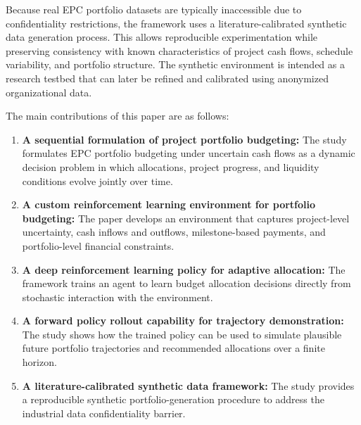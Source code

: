 Because real EPC portfolio datasets are typically inaccessible due to confidentiality restrictions, the framework uses a literature-calibrated synthetic data generation process. This allows reproducible experimentation while preserving consistency with known characteristics of project cash flows, schedule variability, and portfolio structure. The synthetic environment is intended as a research testbed that can later be refined and calibrated using anonymized organizational data.

The main contributions of this paper are as follows:

\begin{enumerate}
    \item \textbf{A sequential formulation of project portfolio budgeting:} The study formulates EPC portfolio budgeting under uncertain cash flows as a dynamic decision problem in which allocations, project progress, and liquidity conditions evolve jointly over time.

    \item \textbf{A custom reinforcement learning environment for portfolio budgeting:} The paper develops an environment that captures project-level uncertainty, cash inflows and outflows, milestone-based payments, and portfolio-level financial constraints.

    \item \textbf{A deep reinforcement learning policy for adaptive allocation:} The framework trains an agent to learn budget allocation decisions directly from stochastic interaction with the environment.

    \item \textbf{A forward policy rollout capability for trajectory demonstration:} The study shows how the trained policy can be used to simulate plausible future portfolio trajectories and recommended allocations over a finite horizon.

    \item \textbf{A literature-calibrated synthetic data framework:} The study provides a reproducible synthetic portfolio-generation procedure to address the industrial data confidentiality barrier.
\end{enumerate}



